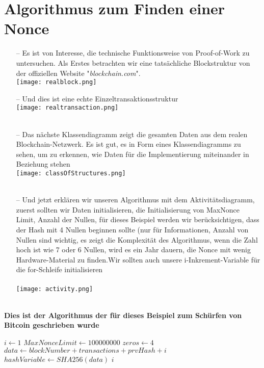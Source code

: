 \documentclass[ngerman]{scrreprt}
\begin{document}
\section{Algorithmus zum Finden einer Nonce}
\begin{itemize}
	\item[--] Es ist von Interesse, die technische Funktionsweise von Proof-of-Work zu untersuchen. Als Erstes betrachten wir eine tatsächliche Blockstruktur von der offiziellen Website "\textit{blockchain.com}".\\
	\texttt{[image: realblock.png]} \\
	\item[--] Und dies ist eine echte Einzeltransaktionsstruktur \\
	\texttt{[image: realtransaction.png]} \\ \\
	\item[--] Das nächste Klassendiagramm zeigt die gesamten Daten aus dem realen Blockchain-Netzwerk. Es ist gut, es in Form eines Klassendiagramms zu sehen, um zu erkennen, wie Daten für die Implementierung miteinander in Beziehung stehen \\
	\texttt{[image: classOfStructures.png]} \\ \\
	\item[--] {Und jetzt erklären wir unseren Algorithmus mit dem Aktivitätsdiagramm, zuerst sollten wir Daten initialisieren, die Initialisierung von Max\textunderscore Nonce \textunderscore Limit, Anzahl der Nullen, für dieses Beispiel werden wir berücksichtigen, dass der Hash mit 4 Nullen beginnen sollte (nur für Informationen, Anzahl von Nullen sind wichtig, es zeigt die Komplexität des Algorithmus, wenn die Zahl hoch ist wie 7 oder 6 Nullen, wird es ein Jahr dauern, die Nonce mit wenig Hardware-Material zu finden.Wir sollten auch unsere i-Inkrement-Variable für die for-Schleife initialisieren } \\ \\
		\texttt{[image: activity.png]} \\ \\
		

	
\end{itemize}
\begin{LARGE}
	\textbf{Dies ist der Algorithmus \textcommabelow der für dieses Beispiel zum Schürfen von Bitcoin geschrieben wurde} \\
\end{LARGE}
\begin{algorithmic}
	\State $i \gets 1$
	\State $MaxNonceLimit \gets 100000000$
	\State $zeros \gets 4$
		\State $data \gets blockNumber + transactions + prvHash + i$
		\State $hashVariable \gets  SHA256(data)$
			\Return $i$
		\EndIf
	\EndFor
	
\end{algorithmic}
\end{document}
